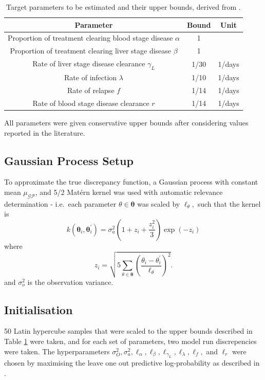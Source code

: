 \begin{table}[htbp]
    \centering
    \begin{tabular}{c |c |c}
        Parameter                                                     & Bound & Unit   \\
        \hline
        Proportion of treatment clearing blood stage disease $\alpha$ & 1     &        \\
        Proportion of treatment clearing liver stage disease $\beta$  & 1     &        \\
        Rate of liver stage disease clearance $\gamma_L$              & 1/30  & 1/days \\
        Rate of infection $\lambda$                                   & 1/10  & 1/days \\
        Rate of relapse $f$                                           & 1/14  & 1/days \\
        Rate of blood stage disease clearance $r$                     & 1/14  & 1/days
    \end{tabular}
    \caption{Target parameters to be estimated and their upper bounds, derived from \cite{champagne_using_2022, white_variation_2016}.}
    \label{table:param_bounds}
\end{table}

All parameters were given conservative upper bounds after considering
values reported in the literature.

\subsection*{Gaussian Process Setup}

To approximate the true discrepancy function, a Gaussian process with constant
mean $\mu_{\mathcal{GP}}$, and 5/2 Mat\'ern kernel was used with automatic
relevance determination - i.e.\ each parameter $\theta\in\bm{\theta}$ was
scaled by $\ell_\theta,$ such
that the kernel is
$$
    k(\bm{\theta}_i, \bm{\theta}_i^\prime)
    = \sigma_a^2 (1 + z_i + \frac{z_i^2}{3})\exp(-z_i)
$$
where
$$
    z_i = \sqrt{
        5 \sum_{\theta\in \bm{\theta}}\left(
        \frac{\theta_i - \theta_i^\prime}{\ell_\theta}
        \right)^2
    }.
$$ and $\sigma^2_o$ is the observation variance.

\subsection*{Initialisation}

50 Latin hypercube samples that were scaled to the upper bounds described in
Table \ref{table:param_bounds} were taken, and for each set of parameters, two
model run discrepencies were taken. The hyper\-parameters
$\sigma_O^2, \sigma_a^2, \ell_\alpha, \ell_\beta, \ell_{\gamma_L}, \ell_\lambda, \ell_f,$
and $\ell_r$ were chosen by maximising the leave one out predictive
log-probability as described in \cite[116]{rasmussen_gaussian_2008}.

